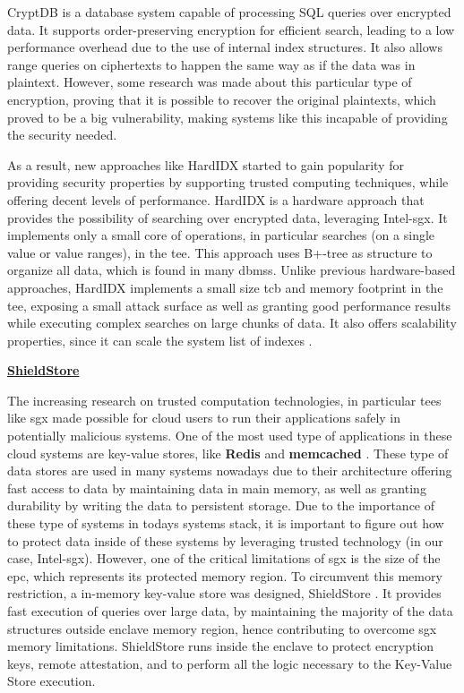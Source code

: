 CryptDB \cite{cryptDBPaper} is a database system capable of processing SQL queries over encrypted data. It supports order-preserving encryption for efficient search, leading to a low performance overhead due to the use of internal index structures. It also allows range queries on ciphertexts to happen the same way as if the data was in plaintext. However, some research  \cite{naveedPaper} was made about this particular type of encryption, proving that it is possible to recover the original plaintexts, which proved to be a big vulnerability, making systems like this incapable of providing the security needed.

As a result, new approaches like HardIDX \cite{hardIDXPaper} started to gain popularity for providing security properties by supporting trusted computing techniques, while offering decent levels of performance.
HardIDX is a hardware approach that provides the possibility of searching over encrypted data, leveraging Intel-\gls{sgx}. It implements only a small core of operations, in particular searches (on a single value or value ranges), in the \gls{tee}.
This approach uses B+-tree as structure to organize all data, which is found in many \gls{dbms}s.
Unlike previous hardware-based approaches, HardIDX implements a small size \gls{tcb} and memory footprint in the \gls{tee}, exposing a small attack surface as well as granting good performance results while executing complex searches on large chunks of data. It also offers scalability properties, since it can scale the system list of indexes \cite{hardIDXPaper}.\newline


\underline{\textbf{ShieldStore}}

The increasing research on trusted computation technologies, in particular \gls{tee}s like \gls{sgx} made possible for cloud users to run their applications safely in potentially malicious systems. One of the most used type of applications in these cloud systems are key-value stores, like \textbf{Redis} \cite{redisWebsite} and \textbf{memcached} \cite{memcachedWebsite}. These type of data stores are used in many systems nowadays due to their architecture offering fast access to data by maintaining data in main memory, as well as granting durability by writing the data to persistent storage.  Due to the importance of these type of systems in todays systems stack, it is important to figure out how to protect data inside of these systems by leveraging trusted technology (in our case, Intel-\gls{sgx}). However, one of the critical limitations of \gls{sgx} is the size of the \gls{epc}, which represents its protected memory region. 
To circumvent this memory restriction, a in-memory key-value store was designed, ShieldStore \cite{shieldStorePaper}. It provides fast execution of queries over large data, by maintaining the majority of the data structures outside enclave memory region, hence contributing to overcome \gls{sgx} memory limitations.
ShieldStore runs inside the enclave to protect encryption keys, remote attestation, and to perform all the logic necessary to the Key-Value Store execution.

